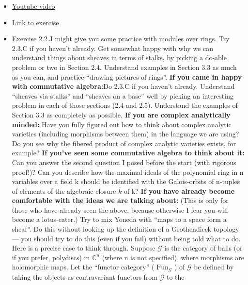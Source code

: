 \documentclass{book}
\theoremstyle{definition}
\begin{document}
\begin{itemize}
    \item \href{https://www.youtube.com/watch?v=q473BSN2_qE}{Youtube video}
    \item \href{https://math216.wordpress.com/2020/07/18/after-the-fourth-pseudolecture/}{Link to exercise}
     \item  Exercise 2.2.J might give you some practice with modules over rings.
         Try 2.3.C if you haven’t already. Get somewhat happy with why we can
         understand things about sheaves in terms of stalks, by picking a
         do-able problem or two in Section 2.4. Understand examples in Section
         3.3 as much as you can, and practice “drawing pictures of rings”.
         \textbf{If you came in happy with commutative algebra:}Do 2.3.C if you haven’t already.
         Understand “sheaves via stalks” and “sheaves on a base” well by picking
         an interesting problem in each of those sections (2.4 and 2.5).
         Understand the examples of Section 3.3 as completely as possible.
         \textbf{If you are complex analytically minded:} Have you fully figured
         out how to think about complex analytic varieties (including morphisms
         between them) in the language we are using? Do you see why the fibered
         product of complex analytic varieties exists, for example?
         \textbf{If you’ve seen some commutative algebra to think about it:} Can
         you answer the second question I posed before the start (with rigorous
         proof!)? Can you describe how the maximal ideals of the polynomial ring
         in n variables over a field k should be identified with the
         Galois-orbits of n-tuples of elements of the algebraic closure
         $\overline{k}$ of k?
         \textbf{If you have already become comfortable with the ideas we are
         talking about:} (This is only for those who have already seen the
         above, because otherwise I fear you will become a lotus-eater.) Try to
         mix Yoneda with “maps to a space form a sheaf”. Do this without looking
         up the definition of a Grothendieck topology — you should try to do
         this (even if you fail) without being told what to do.
         Here is a precise case to think through. Suppose $\mathcal{G}$ is the category of
         balls (or if you prefer, polydiscs) in $\mathbb{C}^n$ (where n is not
         specified), where morphisms are holomorphic maps. Let the “functor
         category” ( ${\text{Fun}}_{\mathcal{G}}$ ) of $\mathcal{G}$ be defined by
         taking the objects as contravariant functors from $\mathcal{G}$ to the

\end{itemize}
\end{document}
